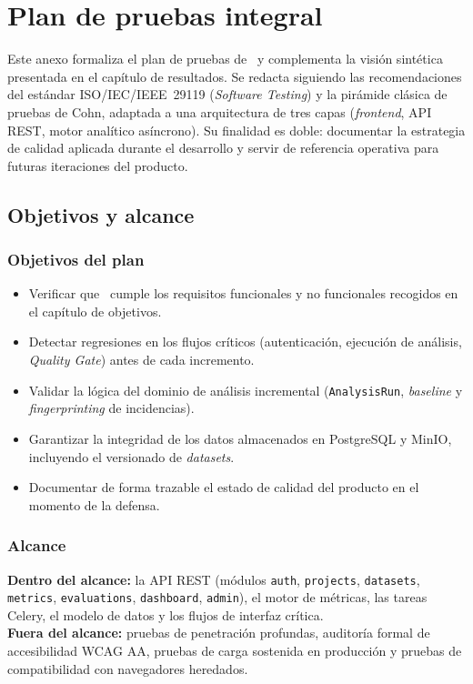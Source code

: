 \chapter{Plan de pruebas integral}
\label{anx:pruebas}

Este anexo formaliza el plan de pruebas de \dataqual\ y complementa la visión
sintética presentada en el capítulo de resultados.  Se redacta siguiendo las
recomendaciones del estándar \acs{ISO}/\acs{IEC}/\acs{IEEE}~29119 (\emph{Software
Testing}) y la pirámide clásica de pruebas de Cohn, adaptada a una arquitectura
de tres capas (\emph{frontend}, \acs{API} \acs{REST}, motor analítico
asíncrono).  Su finalidad es doble: documentar la estrategia de calidad
aplicada durante el desarrollo y servir de referencia operativa para futuras
iteraciones del producto.


\section{Objetivos y alcance}
\label{sec:anx-pruebas-objetivos}

\subsection*{Objetivos del plan}
\begin{itemize}
  \item Verificar que \dataqual\ cumple los requisitos funcionales y no
        funcionales recogidos en el capítulo de objetivos.
  \item Detectar regresiones en los flujos críticos (autenticación, ejecución
        de análisis, \emph{Quality Gate}) antes de cada incremento.
  \item Validar la lógica del dominio de análisis incremental (\texttt{AnalysisRun},
        \emph{baseline} y \emph{fingerprinting} de incidencias).
  \item Garantizar la integridad de los datos almacenados en PostgreSQL y
        MinIO, incluyendo el versionado de \emph{datasets}.
  \item Documentar de forma trazable el estado de calidad del producto en el
        momento de la defensa.
\end{itemize}

\subsection*{Alcance}
\noindent\textbf{Dentro del alcance:} la \acs{API} \acs{REST} (módulos
\texttt{auth}, \texttt{projects}, \texttt{datasets}, \texttt{metrics},
\texttt{evaluations}, \texttt{dashboard}, \texttt{admin}), el motor de
métricas, las tareas Celery, el modelo de datos y los flujos de interfaz
crítica.\\
\noindent\textbf{Fuera del alcance:} pruebas de penetración profundas,
auditoría formal de accesibilidad \acs{WCAG} AA, pruebas de carga
sostenida en producción y pruebas de compatibilidad con navegadores
heredados.


